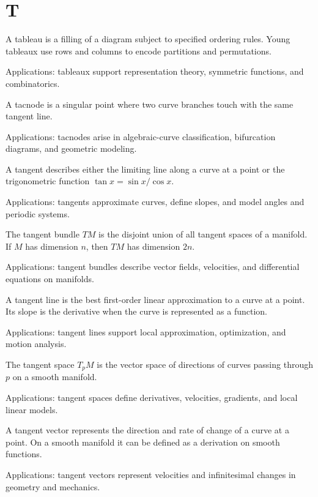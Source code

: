 \chapter*{T}
\label{chap:t}

A tableau is a filling of a diagram subject to specified ordering rules. Young tableaux use rows and columns to encode partitions and permutations. \par\noindent Applications: tableaux support representation theory, symmetric functions, and combinatorics.

A tacnode is a singular point where two curve branches touch with the same tangent line. \par\noindent Applications: tacnodes arise in algebraic-curve classification, bifurcation diagrams, and geometric modeling.

A tangent describes either the limiting line along a curve at a point or the trigonometric function $\tan x=\sin x/\cos x$. \par\noindent Applications: tangents approximate curves, define slopes, and model angles and periodic systems.

The tangent bundle $TM$ is the disjoint union of all tangent spaces of a manifold. If $M$ has dimension $n$, then $TM$ has dimension $2n$. \par\noindent Applications: tangent bundles describe vector fields, velocities, and differential equations on manifolds.

A tangent line is the best first-order linear approximation to a curve at a point. Its slope is the derivative when the curve is represented as a function. \par\noindent Applications: tangent lines support local approximation, optimization, and motion analysis.

The tangent space $T_pM$ is the vector space of directions of curves passing through $p$ on a smooth manifold. \par\noindent Applications: tangent spaces define derivatives, velocities, gradients, and local linear models.

A tangent vector represents the direction and rate of change of a curve at a point. On a smooth manifold it can be defined as a derivation on smooth functions. \par\noindent Applications: tangent vectors represent velocities and infinitesimal changes in geometry and mechanics.


